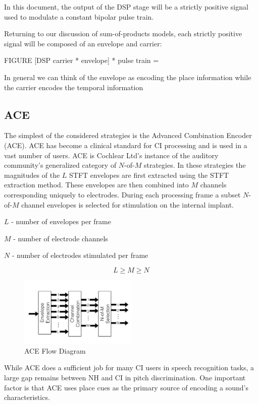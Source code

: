 \documentclass [11pt, proquest] {uwthesis}[2015/03/03]
\begin{document}
In this document, the output of the DSP stage will be a strictly positive signal used to modulate a constant bipolar pulse train.

Returning to our discussion of sum-of-products models, each strictly positive signal will be composed of an envelope and carrier:

FIGURE
[DSP carrier * envelope] * pulse train = ~~~

In general we can think of the envelope as encoding the place information while the carrier encodes the temporal information

\subsection{ACE}

The simplest of the considered strategies is the Advanced Combination Encoder (ACE).  ACE has become a clinical standard for CI processing and is used in a vast number of users.  ACE is Cochlear Ltd's instance of the auditory community's generalized category of $N$-of-$M$ strategies.  In these strategies the magnitudes of the $L$ STFT envelopes are first extracted using the STFT extraction method.  These envelopes are then combined into $M$ channels corresponding uniquely to electrodes.  During each processing frame a subset $N$-of-$M$ channel envelopes is selected for stimulation on the internal implant.

$L$ - number of envelopes per frame

$M$ - number of electrode channels

$N$ - number of electrodes stimulated per frame

$$L \geq M \geq N$$

\begin{figure}[!ht]
  \centering
    \includegraphics[width=0.5\textwidth]{ACE_flow_diagram_explicitTEMP}   
    \caption{ACE Flow Diagram}
\end{figure}

While ACE does a sufficient job for many CI users in speech recognition tasks, a large gap remains between NH and CI in pitch discrimination.  One important factor is that ACE uses place cues as the primary source of encoding a sound's characteristics.
\end{document}
